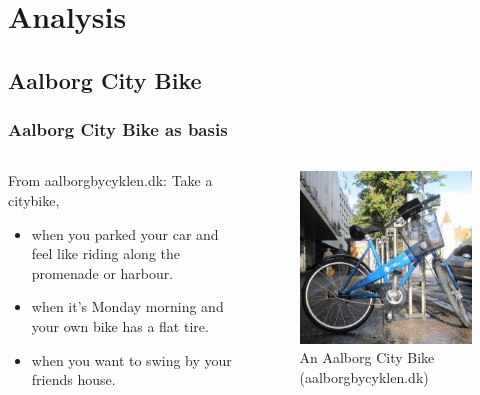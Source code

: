 \section{Analysis}

\subsection{Aalborg City Bike}

\begin{frame}
\frametitle{Aalborg City Bike as basis}
\begin{columns}
\begin{column}{.5\textwidth}
\begin{block}{From aalborgbycyklen.dk:}
Take a citybike,
\begin{itemize}
\item when you parked your car and feel like riding along the promenade or harbour.
\item when it's Monday morning and your own bike has a flat tire.
\item when you want to swing by your friends house.
\end{itemize}
\end{block}
\end{column}
\begin{column}{.5\textwidth}
\begin{figure}
\includegraphics[width=\textwidth]{graphics/acb_bike}
\caption{An Aalborg City Bike (aalborgbycyklen.dk)}
\end{figure}
\end{column}
\end{columns}
\end{frame}


